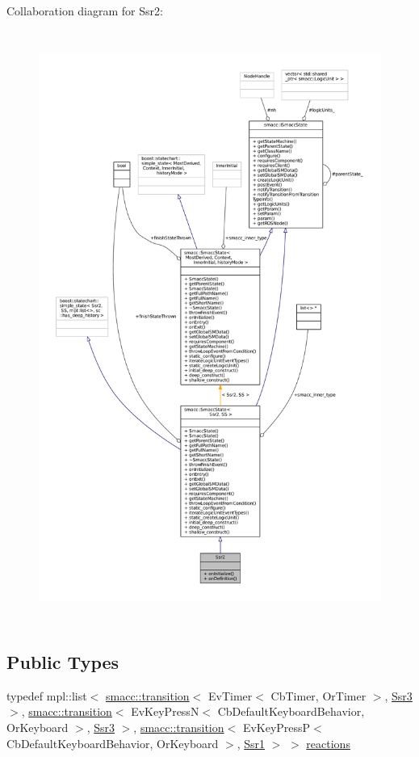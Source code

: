 Collaboration diagram for Ssr2\+:
\nopagebreak
\begin{figure}[H]
\begin{center}
\leavevmode
\includegraphics[height=550pt]{structSsr2__coll__graph}
\end{center}
\end{figure}
\subsection*{Public Types}
\begin{DoxyCompactItemize}
\item 
typedef mpl\+::list$<$ \hyperlink{classsmacc_1_1transition}{smacc\+::transition}$<$ Ev\+Timer$<$ Cb\+Timer, Or\+Timer $>$, \hyperlink{structSsr3}{Ssr3} $>$, \hyperlink{classsmacc_1_1transition}{smacc\+::transition}$<$ Ev\+Key\+PressN$<$ Cb\+Default\+Keyboard\+Behavior, Or\+Keyboard $>$, \hyperlink{structSsr3}{Ssr3} $>$, \hyperlink{classsmacc_1_1transition}{smacc\+::transition}$<$ Ev\+Key\+PressP$<$ Cb\+Default\+Keyboard\+Behavior, Or\+Keyboard $>$, \hyperlink{structSsr1}{Ssr1} $>$ $>$ \hyperlink{structSsr2_ae348e9d3d0ac8b9f064a4e6893cfc5da}{reactions}
\end{DoxyCompactItemize}
